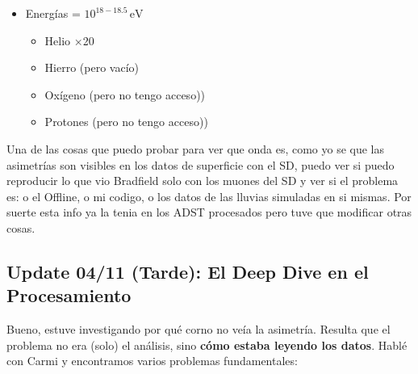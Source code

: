 \begin{itemize}
\begin{itemize}
		\begin{itemize}
			\item Helio ×2
		\end{itemize}
		\item Energías = $10^{18-18.5}\,\text{eV}$
		\begin{itemize}
			\item Helio ×20
			\item Hierro (pero vacío)
			\item Oxígeno (pero no tengo acceso))
			\item Protones (pero no tengo acceso))
		\end{itemize}
	\end{itemize}
\end{itemize}

Una de las cosas que puedo probar para ver que onda es, como yo se que las asimetrías son visibles en los datos de superficie con el SD, puedo ver si puedo reproducir lo que vio Bradfield solo con los muones del SD y ver si el problema es: o el Offline, o mi codigo, o los datos de las lluvias simuladas en si mismas. Por suerte esta info ya la tenia en los ADST procesados pero tuve que modificar otras cosas.


\subsection*{Update 04/11 (Tarde): El Deep Dive en el Procesamiento}

Bueno, estuve investigando por qué corno no veía la asimetría. Resulta que el problema no era (solo) el análisis, sino \textbf{cómo estaba leyendo los datos}. Hablé con Carmi y encontramos varios problemas fundamentales:

